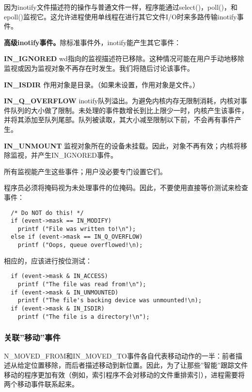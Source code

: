 因为inotify文件描述符的操作与普通文件一样，程序能通过select()，poll()，和epoll()监视它。这允许进程使用单线程在进行其它文件I/O时来多路传输inotify事件。

\textbf{高级inotify事件。}除标准事件外，inotify能产生其它事件：

\begin{eqlist*}
\item[\textbf{IN\_IGNORED}] wd指向的监视描述符已移除。这种情况可能在用户手动地移除监视或因为监视对象不再存在时发生。我们将随后讨论该事件。
\item[\textbf{IN\_ISDIR}] 作用对象是目录。（如果未设置，作用对象是文件。）
\item[\textbf{IN\_Q\_OVERFLOW}] inotify队列溢出。为避免内核内存无限制消耗，内核对事件队列的大小做了限制。未处理的事件数增长到比上限少一时，内核产生该事件，并将其添加至队列尾部。队列被读取，其大小减至限制以下前，不会再有事件产生。
\item[\textbf{IN\_UNMOUNT}] 监视对象所在的设备未挂载。因此，对象不再有效；内核将移除监视，并产生IN\_IGNORED事件。
\end{eqlist*}

所有监视能产生这些事件；用户没必要专门设置它们。

程序员必须将掩码视为未处理事件的位掩码。因此，不要使用直接等价测试来检查事件：

\begin{lstlisting}
  /* Do NOT do this! */
  if (event->mask == IN_MODIFY)
    printf ("File was written to!\n");
  else if (event->mask == IN_Q_OVERFLOW)
    printf ("Oops, queue overflowed!\n);
\end{lstlisting}

相应的，应该进行按位测试：

\begin{lstlisting}
  if (event->mask & IN_ACCESS)
    printf ("The file was read from!\n");
  if (event->mask & IN_UNMOUNTED)
    printf ("The file's backing device was unmounted!\n);
  if (event->mask & IN_ISDIR)
    printf ("The file is a directory!\n");
\end{lstlisting}

\subsubsection{关联''移动''事件}

N\_MOVED\_FROM和IN\_MOVED\_TO事件各自代表移动动作的一半：前者描述从给定位置移除，而后者描述移动到新位置。因此，为了让那些''智能''跟踪文件移动的程序更加有效（例如，索引程序不会对移动的文件重排索引），进程需要将两个移动事件联系起来。

